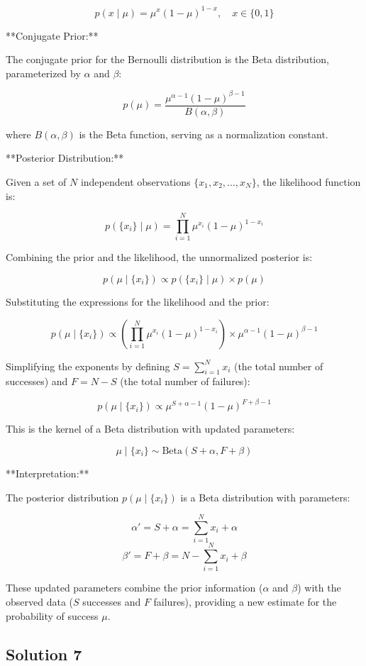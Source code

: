\documentclass[12pt]{article}
\begin{document}
\[
p(x \mid \mu) = \mu^x (1 - \mu)^{1 - x}, \quad x \in \{0, 1\}
\]

**Conjugate Prior:**

The conjugate prior for the Bernoulli distribution is the Beta distribution, parameterized by \( \alpha \) and \( \beta \):

\[
p(\mu) = \frac{\mu^{\alpha - 1} (1 - \mu)^{\beta - 1}}{B(\alpha, \beta)}
\]

where \( B(\alpha, \beta) \) is the Beta function, serving as a normalization constant.

**Posterior Distribution:**

Given a set of \( N \) independent observations \( \{x_1, x_2, \ldots, x_N\} \), the likelihood function is:

\[
p(\{x_i\} \mid \mu) = \prod_{i=1}^N \mu^{x_i} (1 - \mu)^{1 - x_i}
\]

Combining the prior and the likelihood, the unnormalized posterior is:

\[
p(\mu \mid \{x_i\}) \propto p(\{x_i\} \mid \mu) \times p(\mu)
\]

Substituting the expressions for the likelihood and the prior:

\[
p(\mu \mid \{x_i\}) \propto \left( \prod_{i=1}^N \mu^{x_i} (1 - \mu)^{1 - x_i} \right) \times \mu^{\alpha - 1} (1 - \mu)^{\beta - 1}
\]

Simplifying the exponents by defining \( S = \sum_{i=1}^N x_i \) (the total number of successes) and \( F = N - S \) (the total number of failures):

\[
p(\mu \mid \{x_i\}) \propto \mu^{S + \alpha - 1} (1 - \mu)^{F + \beta - 1}
\]

This is the kernel of a Beta distribution with updated parameters:

\[
\mu \mid \{x_i\} \sim \text{Beta}(S + \alpha, F + \beta)
\]

**Interpretation:**

The posterior distribution \( p(\mu \mid \{x_i\}) \) is a Beta distribution with parameters:

\[
\alpha' = S + \alpha = \sum_{i=1}^N x_i + \alpha
\]
\[
\beta' = F + \beta = N - \sum_{i=1}^N x_i + \beta
\]

These updated parameters combine the prior information (\( \alpha \) and \( \beta \)) with the observed data (\( S \) successes and \( F \) failures), providing a new estimate for the probability of success \( \mu \).



\subsection*{Solution 7}
\end{document}

